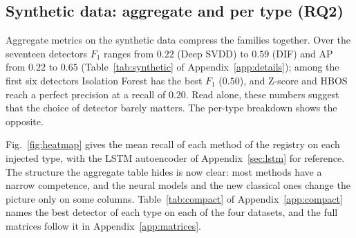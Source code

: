 \documentclass[conference]{IEEEtran}
\begin{document}
\subsection{Synthetic data: aggregate and per type (RQ2)}
\label{sec:results-synthetic}
Aggregate metrics on the synthetic data compress the families together. Over the seventeen
detectors $F_1$ ranges from $0.22$ (Deep SVDD) to $0.59$ (DIF) and AP from $0.22$ to $0.65$
(Table~\ref{tab:synthetic} of Appendix~\ref{app:details}); among the first six detectors Isolation
Forest has the best $F_1$ ($0.50$), and Z-score and HBOS reach a perfect precision at a recall of
$0.20$. Read alone, these numbers suggest that the choice of detector barely matters. The
per-type breakdown shows the opposite.

Fig.~\ref{fig:heatmap} gives the mean recall of each method of the registry on each
injected type, with the LSTM autoencoder of Appendix~\ref{sec:lstm} for reference. The structure
the aggregate table hides is now clear: most methods have a narrow competence, and the
neural models and the new classical ones change the picture only on some columns.
Table~\ref{tab:compact} of Appendix~\ref{app:compact} names the best detector of each type on each of
the four datasets, and the full matrices follow it in Appendix~\ref{app:matrices}.
\end{document}
